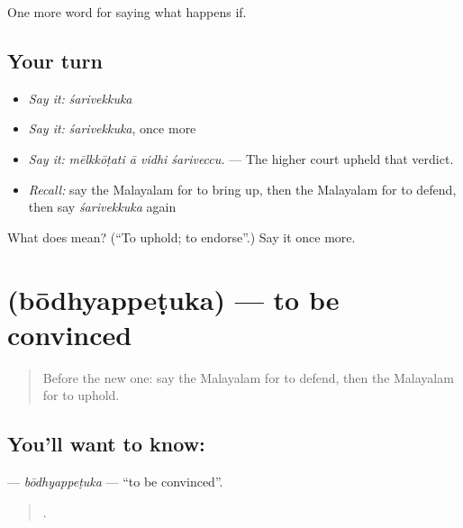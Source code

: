 \begin{grammarlens}[title={What you've built}]
One more word for saying what happens if.
\end{grammarlens}

\subsection*{Your turn}
\begin{itemize}
\raggedright
  \item \emph{Say it:} \emph{śarivekkuka}
  \item \emph{Say it:} \emph{śarivekkuka}, once more
  \item \emph{Say it:} \emph{mēlkkōṭati ā vidhi śariveccu.} — The higher court upheld that verdict.
  \item \emph{Recall:} say the Malayalam for to bring up, then the Malayalam for to defend, then say \emph{śarivekkuka} again
\end{itemize}

\begin{tcolorbox}[breakable,colback=teal!4,colframe=teal!35!black,title={Before you move on}]
What does  mean? (\textquotedblleft{}To uphold; to endorse\textquotedblright{}.) Say it once more.
\end{tcolorbox}
\section[\texorpdfstring{\ml{ബോധ്യപ്പെടുക} (bōdhyappeṭuka)}{ബോധ്യപ്പെടുക (bōdhyappeṭuka)}]{ (bōdhyappeṭuka) — to be convinced}

\label{lesson:ML-C454-bodhyappetuka}



\begin{quote}
Before the new one: say the Malayalam for to defend, then the Malayalam for to uphold.
\end{quote}

\subsection*{You'll want to know: }
\textbf{} — \emph{bōdhyappeṭuka} — \textquotedblleft{}to be convinced\textquotedblright{}.

\begin{quote}
    .
\end{quote}

